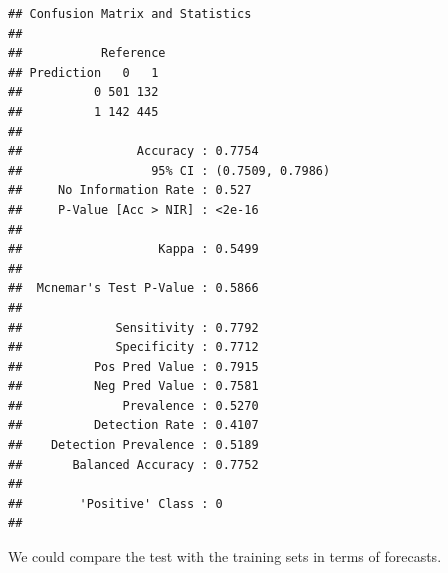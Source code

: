 \documentclass[
]{book}
\begin{document}
\begin{verbatim}
## Confusion Matrix and Statistics
## 
##           Reference
## Prediction   0   1
##          0 501 132
##          1 142 445
##                                           
##                Accuracy : 0.7754          
##                  95% CI : (0.7509, 0.7986)
##     No Information Rate : 0.527           
##     P-Value [Acc > NIR] : <2e-16          
##                                           
##                   Kappa : 0.5499          
##                                           
##  Mcnemar's Test P-Value : 0.5866          
##                                           
##             Sensitivity : 0.7792          
##             Specificity : 0.7712          
##          Pos Pred Value : 0.7915          
##          Neg Pred Value : 0.7581          
##              Prevalence : 0.5270          
##          Detection Rate : 0.4107          
##    Detection Prevalence : 0.5189          
##       Balanced Accuracy : 0.7752          
##                                           
##        'Positive' Class : 0               
## 
\end{verbatim}

We could compare the test with the training sets in terms of forecasts.
\end{document}
